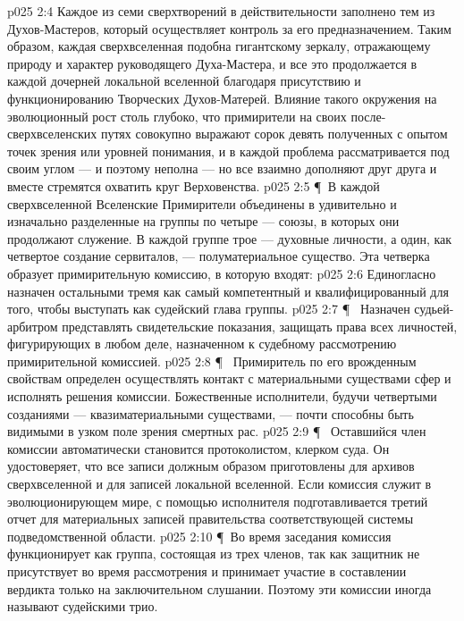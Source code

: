 \vs p025 2:4 Каждое из семи сверхтворений в действительности заполнено тем из Духов\hyp{}Мастеров, который осуществляет контроль за его предназначением. Таким образом, каждая сверхвселенная подобна гигантскому зеркалу, отражающему природу и характер руководящего Духа\hyp{}Мастера, и все это продолжается в каждой дочерней локальной вселенной благодаря присутствию и функционированию Творческих Духов\hyp{}Матерей. Влияние такого окружения на эволюционный рост столь глубоко, что примирители на своих после\hyp{}сверхвселенских путях совокупно выражают сорок девять полученных с опытом точек зрения или уровней понимания, и в каждой проблема рассматривается под своим углом --- и поэтому неполна --- но все взаимно дополняют друг друга и вместе стремятся охватить круг Верховенства.
\vs p025 2:5 \P\ В каждой сверхвселенной Вселенские Примирители объединены в удивительно и изначально разделенные на группы по четыре --- союзы, в которых они продолжают служение. В каждой группе трое --- духовные личности, а один, как четвертое создание сервиталов, --- полуматериальное существо. Эта четверка образует примирительную комиссию, в которую входят:
\vs p025 2:6 \bibnobreakspace {} Единогласно назначен остальными тремя как самый компетентный и квалифицированный для того, чтобы выступать как судейский глава группы.
\vs p025 2:7 \P\ \bibnobreakspace {} Назначен судьей\hyp{}арбитром представлять свидетельские показания, защищать права всех личностей, фигурирующих в любом деле, назначенном к судебному рассмотрению примирительной комиссией.
\vs p025 2:8 \P\ \bibnobreakspace {} Примиритель по его врожденным свойствам определен осуществлять контакт с материальными существами сфер и исполнять решения комиссии. Божественные исполнители, будучи четвертыми созданиями --- квазиматериальными существами, --- почти способны быть видимыми в узком поле зрения смертных рас.
\vs p025 2:9 \P\ \bibnobreakspace {} Оставшийся член комиссии автоматически становится протоколистом, клерком суда. Он удостоверяет, что все записи должным образом приготовлены для архивов сверхвселенной и для записей локальной вселенной. Если комиссия служит в эволюционирующем мире, с помощью исполнителя подготавливается третий отчет для материальных записей правительства соответствующей системы подведомственной области.
\vs p025 2:10 \P\ Во время заседания комиссия функционирует как группа, состоящая из трех членов, так как защитник не присутствует во время рассмотрения и принимает участие в составлении вердикта только на заключительном слушании. Поэтому эти комиссии иногда называют судейскими трио.
